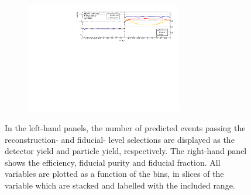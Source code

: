 \begin{figure}[htb]
\begin{subfigure}{.99\textwidth}
    \end{subfigure}
    \begin{subfigure}{.99\textwidth}\centering
        \includegraphics[width = 0.75\textwidth]{Figures/m4l/UnfoldingStudies/v014_inputs/cosThetaStar1_m4loffshellinputs.pdf}
    \end{subfigure}
    \caption{In the left-hand panels, the number of predicted events passing the reconstruction- and fiducial- level selections are displayed as the detector yield and particle yield, respectively. The right-hand panel shows the efficiency, fiducial purity and fiducial fraction. All variables are plotted as a function of the \costhetastar bins, in slices of the \mFourL variable which are stacked and labelled with the included \mFourL range.
    \label{fig:costhet1unf}}
\end{figure}  

\FloatBarrier
\clearpage

